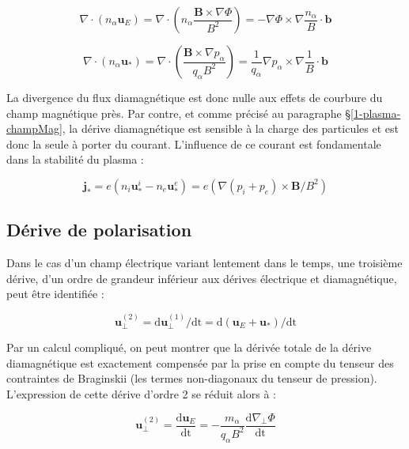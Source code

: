 \begin{refsection}
\begin{equation}
\nabla\cdot\left(n_\alpha\mathbf
u_E\right)=\nabla\cdot\left(n_\alpha\frac{\mathbf B\times\nabla
\Phi}{B^2}\right) =-\nabla \Phi\times\nabla\frac{n_\alpha}{B}\cdot \mathbf b
\end{equation}

\begin{equation}
\nabla\cdot\left(n_\alpha\mathbf
u_*\right)=\nabla\cdot\left(\frac{\mathbf B\times\nabla
p_\alpha}{q_\alpha B^2}\right)
=\frac{1}{q_\alpha}\nabla p_\alpha\times\nabla\frac{1}{B}\cdot \mathbf b
\end{equation}

La divergence du flux diamagnétique est donc nulle aux effets de courbure du
champ magnétique près. Par contre, et comme
précisé au paragraphe \S\ref{1-plasma-champMag}, la dérive diamagnétique est 
sensible à la charge des particules et est donc la seule à porter du courant.
L'influence de ce courant est fondamentale dans la stabilité du plasma :

\begin{equation}
\mathbf j_*=e(n_i\mathbf u^i_*-n_e\mathbf
u^e_*)=e(\nabla(p_i+p_e)\times\mathbf B/B^2)
\end{equation}



\subsection{Dérive de polarisation}

Dans le cas d'un champ électrique variant lentement dans le temps, une troisième
dérive, d'un ordre de grandeur inférieur aux dérives électrique et diamagnétique,
peut être identifiée : 

\begin{equation}
\label{1-vitessePol}
\mathbf{u}_\perp^{(2)}= \text{d}\mathbf
u_\perp^{(1)}/\text{dt}=\text{d}(\mathbf
u_E+\mathbf
u_*)/\text{dt}
\end{equation}

Par un calcul compliqué, on peut montrer que la dérivée totale de la dérive
diamagnétique est exactement compensée par la prise en compte du tenseur des
contraintes de Braginskii (les termes non-diagonaux du tenseur de
pression). L'expression de cette dérive d'ordre 2 se réduit alors à :

\begin{equation}
\label{1-vitessePol}
\mathbf{u}_\perp^{(2)}= \frac{\text{d}\mathbf
u_E}{\text{dt}}=-\frac{m_\alpha}{q_\alpha B^2}\frac{\text{d}\nabla_\perp
\Phi}{\text{dt}}
\end{equation}


\end{refsection}
